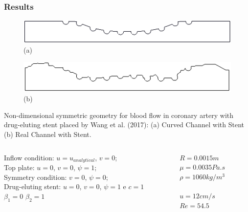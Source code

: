 \begin{frame}
 \frametitle{\LARGE Results}
\begin{figure}
  \vspace{-1cm}
     \centering
     \begin{minipage}{.45\linewidth}
      \centering
      \includegraphics[scale=0.15]{images/CurvedStrut.png}\\
      \scriptsize (a)
     \end{minipage}%
     \begin{minipage}{.45\linewidth}
      \centering
      \includegraphics[scale=0.15]{images/RealStrut.png}\\
      \scriptsize (b)
     \end{minipage}
\end{figure}
\vspace{-0.3cm}
\begin{center}
\scriptsize 
     Non-dimensional symmetric geometry for blood flow in coronary artery with drug-eluting stent placed by Wang et al. (2017):
     (a) Curved Channel with Stent
     (b) Real Channel with Stent.
\end{center}
\vspace{0.05cm}
\small
\begin{center}
\begin{columns}[c]
\begin{column}{0.8\textwidth} 
Inflow condition: $u=u_{analytical}$, $v=0$;\\[0.1cm]
Top plate: $u=0$, $v=0$, $\psi=1$;\\[0.1cm]
Symmetry condition: $v=0$, $\psi=0$; \\[0.1cm]
Drug-eluting stent: $u=0$, $v=0$, $\psi=1$ e $c=1$\\[0.1cm]
$\beta_{1}=0$ \qquad $\beta_{2}=1$
\end{column}
\hspace{-1cm}
\begin{column}{0.3\textwidth}
$R=0.0015m$\\[0.1cm]
$\mu=0.0035Pa.s$\\[0.1cm]
$\rho=1060kg/m^3$\\[0.1cm]\\
$u=12cm/s$\\[0.1cm]
$Re=54.5$
\end{column}
\end{columns}
\end{center}
\end{frame}



